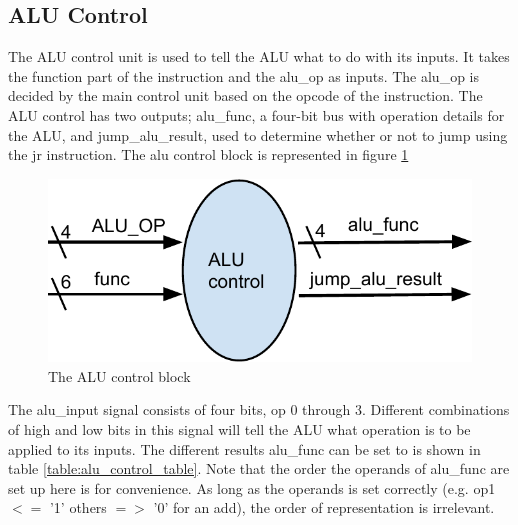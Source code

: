 \subsection{ALU Control}
\label{sec:alu_control}
The ALU control unit is used to tell the ALU what to do with its inputs. It takes the function part of the instruction and the alu\_op as inputs. The alu\_op is decided by the main control unit based on the opcode of the instruction. The ALU control has two outputs; alu\_func, a four-bit bus with operation details for the ALU, and jump\_alu\_result, used to determine whether or not to jump using the jr instruction. The alu control block is represented in figure \ref {fig:alu_control_block}

\begin{figure}[h]
	\label{fig:alu_control_block}
	\includegraphics{figures/alu_control}
	\caption{The ALU control block}
\end{figure}

The alu\_input signal consists of four bits, op 0 through 3. Different combinations of high and low bits in this signal will tell the ALU what operation is to be applied to its inputs.  The different results alu\_func can be set to is shown in table \ref{table:alu_control_table}. Note that the order the operands of alu\_func are set up here is for convenience. As long as the operands is set correctly (e.g. op1 $<=$ '1' others $=>$ '0' for an add), the order of representation is irrelevant. 

